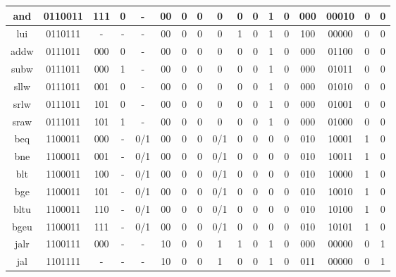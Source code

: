\begin{longtable}{|c<{\raggedright}|c<{\raggedright}|c<{\raggedright}|c|c|c|c|c|c|c|c|c|c|c|c|p{0.3cm}|c|}
\hline
and & 0110011 & 111 & 0 & - & 00 & 0 & 0 & 0 & 0 & 0 & 1 & 0 & 000 & 00010 & 0 & 0 \\
\hline
lui & 0110111 & - & - & - & 00 & 0 & 0 & 0 & 1 & 0 & 1 & 0 & 100 & 00000 & 0 & 0 \\
\hline
addw & 0111011 & 000 & 0 & - & 00 & 0 & 0 & 0 & 0 & 0 & 1 & 0 & 000 & 01100 & 0 & 0 \\
\hline
subw & 0111011 & 000 & 1 & - & 00 & 0 & 0 & 0 & 0 & 0 & 1 & 0 & 000 & 01011 & 0 & 0 \\
\hline
sllw & 0111011 & 001 & 0 & - & 00 & 0 & 0 & 0 & 0 & 0 & 1 & 0 & 000 & 01010 & 0 & 0 \\
\hline
srlw & 0111011 & 101 & 0 & - & 00 & 0 & 0 & 0 & 0 & 0 & 1 & 0 & 000 & 01001 & 0 & 0 \\
\hline
sraw & 0111011 & 101 & 1 & - & 00 & 0 & 0 & 0 & 0 & 0 & 1 & 0 & 000 & 01000 & 0 & 0 \\
\hline
beq & 1100011 & 000 & - & 0/1 & 00 & 0 & 0 & 0/1 & 0 & 0 & 0 & 0 & 010 & 10001 & 1 & 0 \\
\hline
bne & 1100011 & 001 & - & 0/1 & 00 & 0 & 0 & 0/1 & 0 & 0 & 0 & 0 & 010 & 10011 & 1 & 0  \\
\hline
blt & 1100011 & 100 & - & 0/1 & 00 & 0 & 0 & 0/1 & 0 & 0 & 0 & 0 & 010 & 10000 & 1 & 0  \\
\hline
bge & 1100011 & 101 & - & 0/1 & 00 & 0 & 0 & 0/1 & 0 & 0 & 0 & 0 & 010 & 10010 & 1 & 0  \\
\hline
bltu & 1100011 & 110 & - & 0/1 & 00 & 0 & 0 & 0/1 & 0 & 0 & 0 & 0 & 010 & 10100 & 1 & 0  \\
\hline
bgeu & 1100011 & 111 & - & 0/1 & 00 & 0 & 0 & 0/1 & 0 & 0 & 0 & 0 & 010 & 10101 & 1 & 0 \\
\hline
jalr & 1100111 & 000 & - & - & 10 & 0 & 0 & 1 & 1 & 0 & 1 & 0 & 000 & 00000 & 0 & 1 \\
\hline
jal & 1101111 & - & - & - & 10 & 0 & 0 & 1 & 0 & 0 & 1 & 0 & 011 & 00000 & 0 & 1 
\label{tab:asDec05}
\end{longtable}
